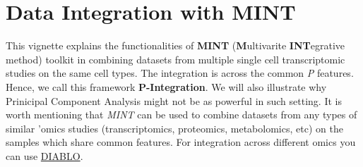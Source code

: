 \documentclass[]{book}
\newenvironment{Shaded}{\begin{snugshade}}{\end{snugshade}}
\newcommand{\CommentTok}[1]{\textcolor[rgb]{0.56,0.35,0.01}{\textit{#1}}}
\newcommand{\KeywordTok}[1]{\textcolor[rgb]{0.13,0.29,0.53}{\textbf{#1}}}
\newcommand{\NormalTok}[1]{#1}
\newcommand{\OperatorTok}[1]{\textcolor[rgb]{0.81,0.36,0.00}{\textbf{#1}}}
\newcommand{\StringTok}[1]{\textcolor[rgb]{0.31,0.60,0.02}{#1}}
\theoremstyle{definition}
\theoremstyle{definition}
\theoremstyle{definition}
\theoremstyle{remark}
\begin{document}
\begin{Shaded}
\end{Shaded}

\hypertarget{data-integration-with-mint}{%
\chapter{Data Integration with MINT}\label{data-integration-with-mint}}

This vignette explains the functionalities of \textbf{MINT}
(\textbf{M}ultivarite \textbf{INT}egrative method) \citep{mint} toolkit
in combining datasets from multiple single cell transcriptomic studies
on the same cell types. The integration is across the common \emph{P}
features. Hence, we call this framework \textbf{P-Integration}. We will
also illustrate why Prinicipal Component Analysis might not be as
powerful in such setting. It is worth mentioning that \emph{MINT} can be
used to combine datasets from any types of similar 'omics studies
(transcriptomics, proteomics, metabolomics, etc) on the samples which
share common features. For integration across different omics you can
use \href{http://mixomics.org/mixdiablo/}{DIABLO}.
\end{document}
